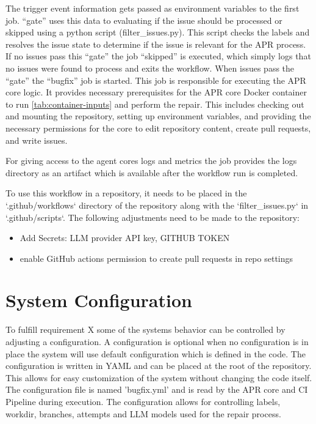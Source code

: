 The trigger event information gets passed as environment variables to the first job. ``gate'' uses this data to evaluating if the issue should be processed or skipped using a python script (filter\_issues.py). This script checks the labels and resolves the issue state to determine if the issue is relevant for the APR process. If no issues pass this ``gate'' the job ``skipped'' is executed, which simply logs that no issues were found to process and exits the workflow. When issues pass the ``gate'' the ``bugfix'' job is started.  This job is responsible for executing the APR core logic. It provides necessary prerequisites for the APR core Docker container to run \ref{tab:container-inputs} and perform the repair. This includes checking out and mounting the repository, setting up environment variables, and providing the necessary permissions for the core to edit repository content, create pull requests, and write issues.

For giving access to the agent cores logs and metrics the job provides the logs directory as an artifact which is available after the workflow run is completed.

To use this workflow in a repository, it needs to be placed in the `.github/workflows` directory of the repository along with the `filter\_issues.py` in `.github/scripts`.
The following adjustments need to be made to the repository:
\begin{itemize}
    \item Add Secrets: LLM provider API key, GITHUB TOKEN
    \item enable GitHub actions permission to create pull requests in repo settings
\end{itemize}


\section{System Configuration}

To fulfill requirement X some of the systems behavior can be controlled by adjusting a configuration. A configuration is optional when no configuration is in place the system will use default configuration which is defined in the code. The configuration is written in YAML and can be placed at the root of the repository. This allows for easy customization of the system without changing the code itself. The configuration file is named 'bugfix.yml' and is read by the APR core and CI Pipeline during execution. The configuration allows for controlling labels, workdir, branches, attempts and LLM models used for the repair process.


